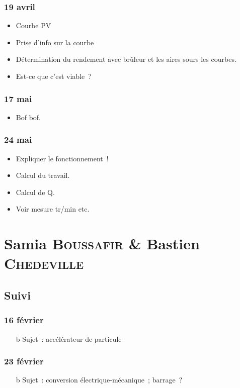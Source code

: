 \documentclass[a4paper, 11pt, final, garamond]{book}
\begin{document}
\subsection{19 avril}
\begin{itemize}
	\item Courbe PV
	\item Prise d'info sur la courbe
	\item Détermination du rendement avec brûleur et les aires sours les courbes.
	\item Est-ce que c'est viable~?
\end{itemize}

\subsection{17 mai}
\begin{itemize}
	\item Bof bof.
\end{itemize}

\subsection{24 mai}
\begin{itemize}
	\item Expliquer le fonctionnement~!
	\item Calcul du travail.
	\item Calcul de Q.
	\item Voir mesure tr/min etc.
\end{itemize}

\chapter{Samia \textsc{Boussafir} \& Bastien \textsc{Chedeville}}
\label{ch:boussafirchedeville}

\section{Suivi}
\subsection{16 février}
\begin{itemize}
	\item[b]{Sujet}~: accélérateur de particule
\end{itemize}

\subsection{23 février}
\begin{itemize}
	\item[b]{Sujet}~: conversion électrique-mécanique~; barrage~?
\end{itemize}
\end{document}
